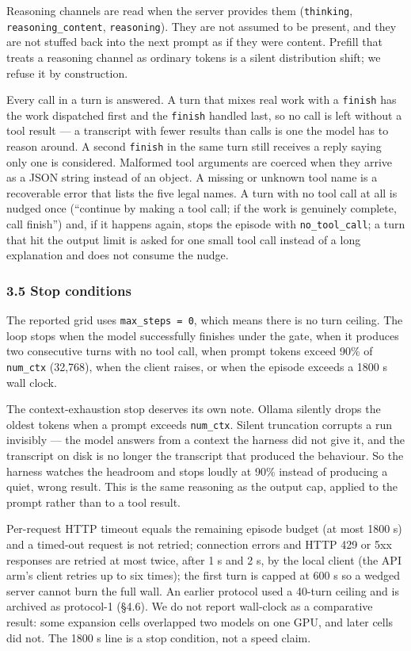 \documentclass[
  10pt,
  a4paper,
]{article}
\let\oldtexttt\texttt
\renewcommand{\texttt}[1]{{\small\oldtexttt{#1}}}
\begin{document}
Reasoning channels are read when the server provides them
(\texttt{thinking}, \texttt{reasoning\_content}, \texttt{reasoning}).
They are not assumed to be present, and they are not stuffed back into
the next prompt as if they were content. Prefill that treats a reasoning
channel as ordinary tokens is a silent distribution shift; we refuse it
by construction.

Every call in a turn is answered. A turn that mixes real work with a
\texttt{finish} has the work dispatched first and the \texttt{finish}
handled last, so no call is left without a tool result --- a transcript
with fewer results than calls is one the model has to reason around. A
second \texttt{finish} in the same turn still receives a reply saying
only one is considered. Malformed tool arguments are coerced when they
arrive as a JSON string instead of an object. A missing or unknown tool
name is a recoverable error that lists the five legal names. A turn with
no tool call at all is nudged once (``continue by making a tool call; if
the work is genuinely complete, call finish'') and, if it happens again,
stops the episode with \texttt{no\_tool\_call}; a turn that hit the
output limit is asked for one small tool call instead of a long
explanation and does not consume the nudge.

\subsubsection{3.5 Stop conditions}\label{stop-conditions}

The reported grid uses \texttt{max\_steps\ =\ 0}, which means there is
no turn ceiling. The loop stops when the model successfully finishes
under the gate, when it produces two consecutive turns with no tool
call, when prompt tokens exceed 90\% of \texttt{num\_ctx} (32,768), when
the client raises, or when the episode exceeds a 1800 s wall clock.

The context-exhaustion stop deserves its own note. Ollama silently drops
the oldest tokens when a prompt exceeds \texttt{num\_ctx}. Silent
truncation corrupts a run invisibly --- the model answers from a context
the harness did not give it, and the transcript on disk is no longer the
transcript that produced the behaviour. So the harness watches the
headroom and stops loudly at 90\% instead of producing a quiet, wrong
result. This is the same reasoning as the output cap, applied to the
prompt rather than to a tool result.

Per-request HTTP timeout equals the remaining episode budget (at most
1800 s) and a timed-out request is not retried; connection errors and
HTTP 429 or 5xx responses are retried at most twice, after 1 s and 2 s,
by the local client (the API arm's client retries up to six times); the
first turn is capped at 600 s so a wedged server cannot burn the full
wall. An earlier protocol used a 40-turn ceiling and is archived as
protocol-1 (§4.6). We do not report wall-clock as a comparative result:
some expansion cells overlapped two models on one GPU, and later cells
did not. The 1800 s line is a stop condition, not a speed claim.
\end{document}
